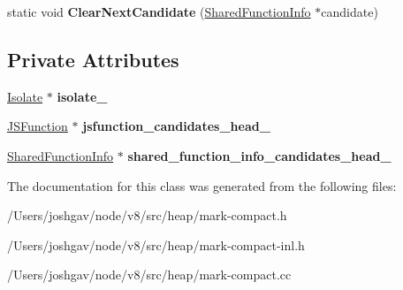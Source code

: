 \begin{DoxyCompactItemize}
\item 
static void {\bfseries Clear\+Next\+Candidate} (\hyperlink{classv8_1_1internal_1_1_shared_function_info}{Shared\+Function\+Info} $\ast$candidate)\hypertarget{classv8_1_1internal_1_1_code_flusher_a03600c005f42a0889ce72bea1d91cc72}{}\label{classv8_1_1internal_1_1_code_flusher_a03600c005f42a0889ce72bea1d91cc72}

\end{DoxyCompactItemize}
\subsection*{Private Attributes}
\begin{DoxyCompactItemize}
\item 
\hyperlink{classv8_1_1internal_1_1_isolate}{Isolate} $\ast$ {\bfseries isolate\+\_\+}\hypertarget{classv8_1_1internal_1_1_code_flusher_a5a4e16f5dd575889d302a0e242025dc8}{}\label{classv8_1_1internal_1_1_code_flusher_a5a4e16f5dd575889d302a0e242025dc8}

\item 
\hyperlink{classv8_1_1internal_1_1_j_s_function}{J\+S\+Function} $\ast$ {\bfseries jsfunction\+\_\+candidates\+\_\+head\+\_\+}\hypertarget{classv8_1_1internal_1_1_code_flusher_a6a73fe830c602b45702c1255d02e14e6}{}\label{classv8_1_1internal_1_1_code_flusher_a6a73fe830c602b45702c1255d02e14e6}

\item 
\hyperlink{classv8_1_1internal_1_1_shared_function_info}{Shared\+Function\+Info} $\ast$ {\bfseries shared\+\_\+function\+\_\+info\+\_\+candidates\+\_\+head\+\_\+}\hypertarget{classv8_1_1internal_1_1_code_flusher_a7f402d6230d90aab14c6f338c5d6599d}{}\label{classv8_1_1internal_1_1_code_flusher_a7f402d6230d90aab14c6f338c5d6599d}

\end{DoxyCompactItemize}


The documentation for this class was generated from the following files\+:\begin{DoxyCompactItemize}
\item 
/\+Users/joshgav/node/v8/src/heap/mark-\/compact.\+h\item 
/\+Users/joshgav/node/v8/src/heap/mark-\/compact-\/inl.\+h\item 
/\+Users/joshgav/node/v8/src/heap/mark-\/compact.\+cc\end{DoxyCompactItemize}
